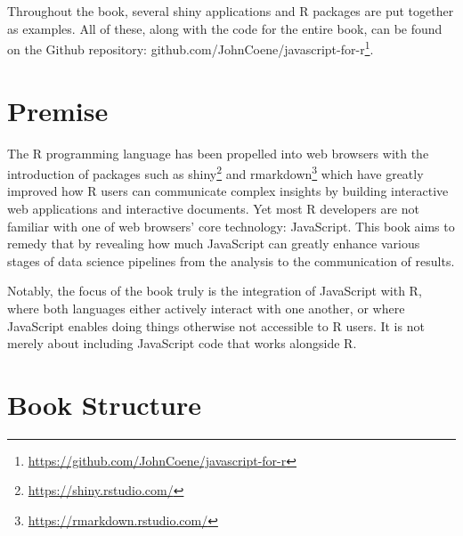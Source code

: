 \documentclass[
]{krantz}
\renewcommand{\href}[2]{#2\footnote{\url{#1}}}
\begin{document}
Throughout the book, several shiny applications and R packages are put together as examples. All of these, along with the code for the entire book, can be found on the Github repository: \href{https://github.com/JohnCoene/javascript-for-r}{github.com/JohnCoene/javascript-for-r}.

\hypertarget{premise}{%
\section*{Premise}\label{premise}}


The R programming language has been propelled into web browsers with the introduction of packages such as \href{https://shiny.rstudio.com/}{shiny} \citep{R-shiny} and \href{https://rmarkdown.rstudio.com/}{rmarkdown} \citep{R-rmarkdown} which have greatly improved how R users can communicate complex insights by building interactive web applications and interactive documents. Yet most R developers are not familiar with one of web browsers' core technology: JavaScript. This book aims to remedy that by revealing how much JavaScript can greatly enhance various stages of data science pipelines from the analysis to the communication of results.

Notably, the focus of the book truly is the integration of JavaScript with R, where both languages either actively interact with one another, or where JavaScript enables doing things otherwise not accessible to R users. It is not merely about including JavaScript code that works alongside R.

\hypertarget{book-structure}{%
\section*{Book Structure}\label{book-structure}}
\end{document}
